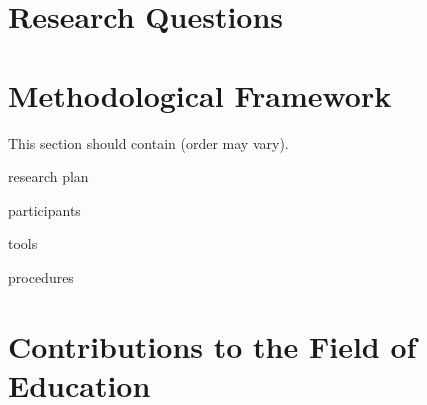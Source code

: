 \documentclass[
doc, 
biblatex,
12pt
]{apa6}
\begin{document}
\lipsum[2] %

\section{Research Questions}

\lipsum[3] %

\section{Methodological Framework}
This section should contain (order may vary).

\begin{APAitemize}
\item research plan
\item participants
\item tools
\item procedures
\end{APAitemize}


\section{Contributions to the Field of Education}
\lipsum[4]

\printbibliography[title=References]
\end{document}

